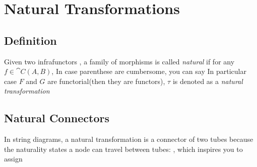 \section{Natural Transformations}

\subsection{Definition}

Given two infrafunctors
, a family of morphisms
is called \textit{natural} if for any $f \in \cat{C}(A,B)$,
In case parenthese are cumbersome, you can say
In particular case $F$ and $G$ are functorial(then they are functors), $\tau$ is denoted as a \textit{natural transformation}

\subsection{Natural Connectors}

In string diagrams, a natural transformation is a connector of two tubes
because the naturality states a node can travel between tubes:
, which inspires you to assign



